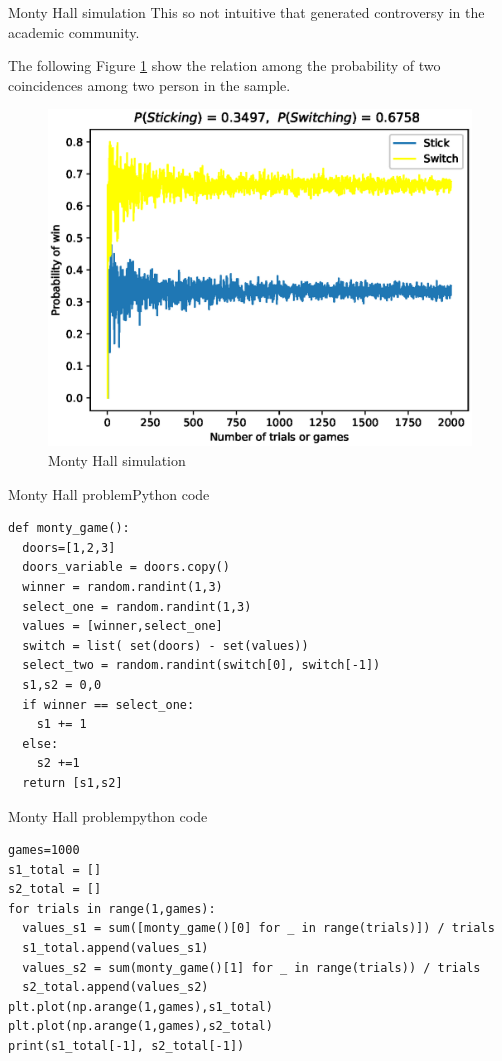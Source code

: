 \documentclass{beamer}
\begin{document}
\begin{frame}{Monty Hall simulation}
This so not intuitive that generated controversy in the academic community.
\end{frame}



\begin{frame}
The following Figure \ref{fig} show the relation among the probability of two coincidences among two person in the sample.
\begin{figure}[htbp]
\centerline{\includegraphics[scale=0.8]{./graphs/Monty.eps}}
\caption{Monty Hall simulation}
\label{fig}
\end{figure}
\end{frame}





\begin{frame}[fragile]{Monty Hall problem}{Python code}
\begin{lstlisting}
def monty_game():
  doors=[1,2,3]
  doors_variable = doors.copy()
  winner = random.randint(1,3)
  select_one = random.randint(1,3)
  values = [winner,select_one]
  switch = list( set(doors) - set(values))
  select_two = random.randint(switch[0], switch[-1])
  s1,s2 = 0,0
  if winner == select_one:
    s1 += 1
  else:
    s2 +=1
  return [s1,s2]
\end{lstlisting}
\end{frame}

\begin{frame}[fragile]{Monty Hall problem}{python code}
\begin{lstlisting}
games=1000
s1_total = []
s2_total = []
for trials in range(1,games):
  values_s1 = sum([monty_game()[0] for _ in range(trials)]) / trials
  s1_total.append(values_s1)
  values_s2 = sum(monty_game()[1] for _ in range(trials)) / trials 
  s2_total.append(values_s2)
plt.plot(np.arange(1,games),s1_total)
plt.plot(np.arange(1,games),s2_total)
print(s1_total[-1], s2_total[-1])
\end{lstlisting}
\end{frame}
\end{document}
